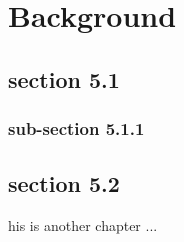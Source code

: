 \chapter{Background}
\minitoc
\section{section 5.1}
\subsection{sub-section 5.1.1}
\section{section 5.2}
his is another chapter ...